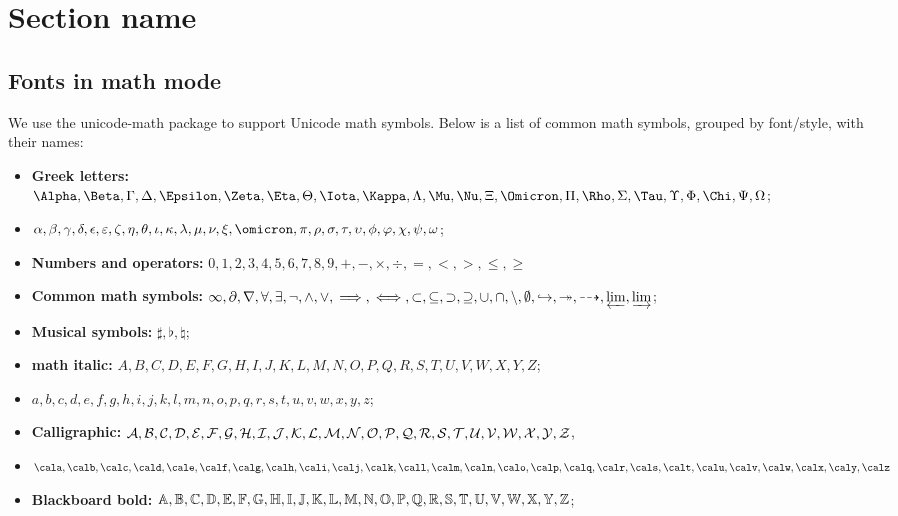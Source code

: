 \section{Section name}\label{sec:test}

\subsection{Fonts in math mode}

    We use the unicode-math package to support Unicode math symbols. Below is a list of common math symbols, grouped by font/style, with their names:

    \begin{itemize}
        \item \textbf{Greek letters:} \(\Alpha, \Beta, \Gamma, \Delta, \Epsilon, \Zeta, \Eta, \Theta, \Iota, \Kappa, \Lambda, \Mu, \Nu, \Xi, \Omicron, \Pi, \Rho, \Sigma, \Tau, \Upsilon, \Phi, \Chi, \Psi, \Omega\); 
        \item \(\alpha, \beta, \gamma, \delta, \epsilon, \varepsilon, \zeta, \eta, \theta, \iota, \kappa, \lambda, \mu, \nu, \xi, \omicron, \pi, \rho, \sigma, \tau, \upsilon, \phi, \varphi, \chi, \psi, \omega\);
        \item \textbf{Numbers and operators:} \(0, 1, 2, 3, 4, 5, 6, 7, 8, 9, +, -, \times, \div, =, <, >, \leq, \geq\)
        \item \textbf{Common math symbols:} \(\infty, \partial, \nabla, \forall, \exists, \neg, \land, \lor, \implies, \iff, \subset, \subseteq, \supset, \supseteq, \cup, \cap, \setminus, \emptyset,\hookrightarrow,\twoheadrightarrow,\dasharrow,\varprojlim,\varinjlim\);
        \item \textbf{Musical symbols:} \(\sharp, \flat, \natural\);
        \item \textbf{math italic:} \(A, B, C, D, E, F, G, H, I, J, K, L, M, N, O, P, Q, R, S, T, U, V, W, X, Y, Z\); 
        \item \(a, b, c, d, e, f, g, h, i, j, k, l, m, n, o, p, q, r, s, t, u, v, w, x, y, z\);
        \item \textbf{Calligraphic:} ${\mathcal{A}}, {\mathcal{B}}, {\mathcal{C}}, {\mathcal{D}}, {\mathcal{E}}, {\mathcal{F}}, {\mathcal{G}}, {\mathcal{H}}, {\mathcal{I}}, {\mathcal{J}}, {\mathcal{K}}, {\mathcal{L}}, {\mathcal{M}}, {\mathcal{N}}, {\mathcal{O}}, {\mathcal{P}}, {\mathcal{Q}}, {\mathcal{R}}, {\mathcal{S}}, {\mathcal{T}}, {\mathcal{U}}, {\mathcal{V}}, {\mathcal{W}}, {\mathcal{X}}, {\mathcal{Y}}, {\mathcal{Z}}$, 
        \item $\cala, \calb, \calc, \cald, \cale, \calf, \calg, \calh, \cali, \calj, \calk, \call, \calm, \caln, \calo, \calp, \calq, \calr, \cals, \calt, \calu, \calv, \calw, \calx, \caly, \calz$
        \item \textbf{Blackboard bold:} \({\mathbb{A}}, {\mathbb{B}}, {\mathbb{C}}, {\mathbb{D}}, {\mathbb{E}}, {\mathbb{F}}, {\mathbb{G}}, {\mathbb{H}}, {\mathbb{I}}, {\mathbb{J}}, {\mathbb{K}}, {\mathbb{L}}, {\mathbb{M}}, {\mathbb{N}}, {\mathbb{O}}, {\mathbb{P}}, {\mathbb{Q}}, {\mathbb{R}}, {\mathbb{S}}, {\mathbb{T}}, {\mathbb{U}}, {\mathbb{V}}, {\mathbb{W}}, {\mathbb{X}}, {\mathbb{Y}}, {\mathbb{Z}}\);

\end{itemize}
